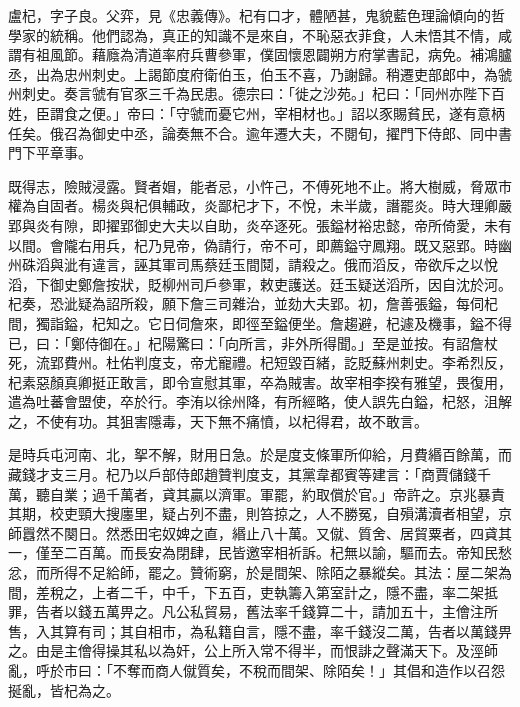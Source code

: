 
\begin{pinyinscope}

 盧杞，字子良。父弈，見《忠義傳》。杞有口才，體陋甚，鬼貌藍色理論傾向的哲學家的統稱。他們認為，真正的知識不是來自，不恥惡衣菲食，人未悟其不情，咸謂有祖風節。藉廕為清道率府兵曹參軍，僕固懷恩闢朔方府掌書記，病免。補鴻臚丞，出為忠州刺史。上謁節度府衛伯玉，伯玉不喜，乃謝歸。稍遷吏部郎中，為虢州刺史。奏言虢有官豕三千為民患。德宗曰：「徙之沙苑。」杞曰：「同州亦陛下百姓，臣謂食之便。」帝曰：「守虢而憂它州，宰相材也。」詔以豕賜貧民，遂有意柄任矣。俄召為御史中丞，論奏無不合。逾年遷大夫，不閱旬，擢門下侍郎、同中書門下平章事。



 既得志，險賊浸露。賢者媢，能者忌，小忤己，不傅死地不止。將大樹威，脅眾市權為自固者。楊炎與杞俱輔政，炎鄙杞才下，不悅，未半歲，譖罷炎。時大理卿嚴郢與炎有隙，即擢郢御史大夫以自助，炎卒逐死。張鎰材裕忠懿，帝所倚愛，未有以間。會隴右用兵，杞乃見帝，偽請行，帝不可，即薦鎰守鳳翔。既又惡郢。時幽州硃滔與泚有違言，誣其軍司馬蔡廷玉間鬩，請殺之。俄而滔反，帝欲斥之以悅滔，下御史鄭詹按狀，貶柳州司戶參軍，敕吏護送。廷玉疑送滔所，因自沈於河。杞奏，恐泚疑為詔所殺，願下詹三司雜治，並劾大夫郢。初，詹善張鎰，每伺杞間，獨詣鎰，杞知之。它日伺詹來，即徑至鎰便坐。詹趨避，杞遽及機事，鎰不得已，曰：「鄭侍御在。」杞陽驚曰：「向所言，非外所得聞。」至是並按。有詔詹杖死，流郢費州。杜佑判度支，帝尤寵禮。杞短毀百緒，訖貶蘇州刺史。李希烈反，杞素惡顏真卿挺正敢言，即令宣慰其軍，卒為賊害。故宰相李揆有雅望，畏復用，遣為吐蕃會盟使，卒於行。李洧以徐州降，有所經略，使人誤先白鎰，杞怒，沮解之，不使有功。其狙害隱毒，天下無不痛憤，以杞得君，故不敢言。



 是時兵屯河南、北，挐不解，財用日急。於是度支條軍所仰給，月費緡百餘萬，而藏錢才支三月。杞乃以戶部侍郎趙贊判度支，其黨韋都賓等建言：「商賈儲錢千萬，聽自業；過千萬者，貣其贏以濟軍。軍罷，約取償於官。」帝許之。京兆暴責其期，校吏頸大搜廛里，疑占列不盡，則笞掠之，人不勝冤，自殞溝瀆者相望，京師囂然不闋日。然悉田宅奴婢之直，緡止八十萬。又僦、質舍、居貿粟者，四貣其一，僅至二百萬。而長安為閉肆，民皆邀宰相祈訴。杞無以諭，驅而去。帝知民愁忿，而所得不足給師，罷之。贊術窮，於是間架、除陌之暴縱矣。其法：屋二架為間，差稅之，上者二千，中千，下五百，吏執籌入第室計之，隱不盡，率二架抵罪，告者以錢五萬畀之。凡公私貿易，舊法率千錢算二十，請加五十，主儈注所售，入其算有司；其自相市，為私籍自言，隱不盡，率千錢沒二萬，告者以萬錢畀之。由是主儈得操其私以為奸，公上所入常不得半，而恨誹之聲滿天下。及涇師亂，呼於市曰：「不奪而商人僦質矣，不稅而間架、除陌矣！」其倡和造作以召怨挻亂，皆杞為之。




\end{pinyinscope}
